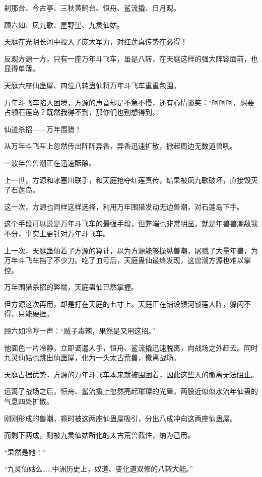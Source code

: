
\begin{this_body}

刹那台、今古亭、三秋黄鹤台、恒舟、鲨流撬、日月观。

顾六如、凤九歌、星野望、九灵仙姑。

天庭在光阴长河中投入了庞大军力，对红莲真传势在必得！

反观方源一方，只有一座万年斗飞车，虽是八转，在天庭这样的强大阵容面前，也显得单薄。

天庭六座仙蛊屋、四位八转蛊仙将万年斗飞车重重包围。

万年斗飞车陷入困境，方源的声音却是不急不慢，还有心情谈笑：“呵呵呵，想要占领石莲岛？既然我得不到，那你们也别想得到。”

仙道杀招——万年围猎！

从万年斗飞车上忽然传出阵阵异香，异香迅速扩散，掀起周边无数道兽吼。

一波年兽兽潮正在迅速酝酿。

上一世，方源和冰塞川联手，和天庭抢夺红莲真传，结果被凤九歌破坏，直接毁灭了石莲岛。

这一次，方源也同样这样选择，利用万年围猎发动无边兽潮，对石莲岛下手。

这个手段可以说是万年斗飞车的最强手段，但弊端也非常明显，就是年兽兽潮敌我不分，事实上更针对万年斗飞车。

上一次，天庭蛊仙着了方源的算计，以为方源能够操纵兽潮，屠戮了大量年兽，为万年斗飞车挡了不少刀。吃了血亏后，天庭蛊仙最终发现，这兽潮方源也难以掌控。

万年围猎杀招的弊端，天庭蛊仙已然掌握。

但方源这次再用，却是打在天庭的七寸上。天庭正在铺设镇河锁莲大阵，躲闪不得，只能硬捱。

顾六如冷哼一声：“贼子毒辣，果然是又用这招。”

他面色一片冷静，立即调遣人手，恒舟、鲨流撬迅速脱离，向战场之外赶去。同时九灵仙姑也跳出仙蛊屋，化为一头太古荒兽，撤离战场。

天庭占据优势，方源的万年斗飞车本来就被围困着，因此这些人的撤离无法阻止。

远离了战场之后，恒舟、鲨流撬上忽然亮起璀璨的光晕，两股近似似水流年仙蛊的气息四处扩散。

刚刚形成的兽潮，顿时被这两座仙蛊屋吸引，分出八成冲向这两座仙蛊屋。

而剩下两成，则被九灵仙姑所化的太古荒兽截住，纳为己用。

“果然是她！”

“九灵仙姑么……中洲历史上，奴道、变化道双修的八转大能。”


\end{this_body}
